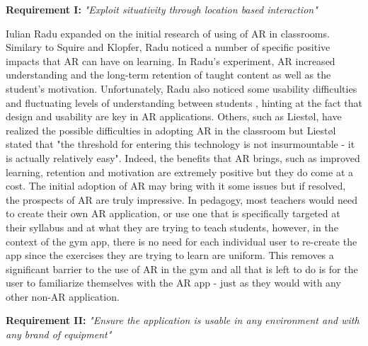 \documentclass{l4proj}
\begin{document}
\textbf{Requirement I:} \textit{"Exploit situativity through location based interaction"}


Iulian Radu expanded on the initial research of using of AR in classrooms. Similary to Squire and Klopfer, Radu noticed a number of specific positive impacts that AR can have on learning. In Radu's experiment, AR increased understanding and the long-term retention of taught content as well as the student's motivation\cite{radu_why_2012}. Unfortunately, Radu also noticed some usability difficulties and fluctuating levels of understanding between students \cite{radu_why_2012}, hinting at the fact that design and usability are key in AR applications. Others, such as Liestøl, have realized the possible difficulties in adopting AR in the classroom but Liestøl stated that "the threshold for entering this technology is not insurmountable - it is actually relatively easy"\cite{liestol_learning_2011}. Indeed, the benefits that AR brings, such as improved learning, retention and motivation are extremely positive but they do come at a cost. The initial adoption of AR may bring with it some issues but if resolved, the prospects of AR are truly impressive. In  pedagogy, most teachers would need to create their own AR application, or use one that is specifically targeted at their syllabus and at what they are trying to teach students, however, in the context of the gym app, there is no need for each individual user to re-create the app since the exercises they are trying to learn are uniform. This removes a significant barrier to the use of AR in the gym and all that is left to do is for the user to familiarize themselves with the AR app - just as they would with any other non-AR application. 

\textbf{Requirement II:} \textit{"Ensure the application is usable in any environment and with any brand of equipment"}
\end{document}
